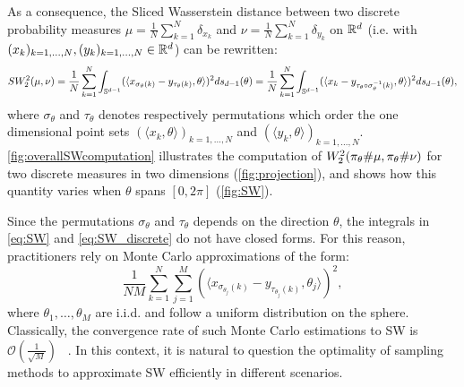 
As a consequence, the Sliced Wasserstein distance between two discrete
probability measures $\mu =
\frac{1}{N}\sum\limits_{k=1}^N \delta_{x_k}$ and  $\nu =
\frac{1}{N}\sum\limits_{k=1}^N \delta_{y_k}$ on $\mathbb{R}^{d}$ (i.e. with
$(x_k)_{k=1,\hdots,N},(y_k)_{k=1,\hdots,N} \in \mathbb{R}^{d}$) can be rewritten{:} 
\begin{equation} \label{eq:SW_discrete}
SW_2^2(\mu,\nu)= \frac{1}{N}\sum\limits_{k=1}^N\displaystyle\int_{\mathbb{S}^{d-1}}
(\langle x_{\sigma_{\theta}(k)} - y_{\tau_{\theta}(k)},\theta\rangle)^2
ds_{d-1}(\theta) = \frac{1}{N}\sum\limits_{k=1}^N\displaystyle\int_{\mathbb{S}^{d-1}}
(\langle x_{k} - y_{\tau_{\theta} \circ \sigma_{\theta}^{-1}(k)},\theta\rangle)^2
ds_{d-1}(\theta)  ,
\end{equation}
where
$\sigma_{\theta}$ and $\tau_{\theta}$ denotes respectively 
permutations which order the one dimensional  point sets $(\langle x_k,\theta\rangle)_{k=1,\hdots,N}$
and $(\langle y_k,\theta\rangle)_{k=1,\hdots,N}$. 
{\autoref{fig:overallSWcomputation}}
illustrates the
computation of $W_2^2(\pi_{\theta} \# \mu, \pi_{\theta} \# \nu)$ for two discrete measures in two dimensions 
{(\autoref{fig:projection})}, and 
{shows}
how this quantity varies when $\theta$ spans $[0,2\pi]$ 
{(\autoref{fig:SW})}.

\noindent Since the permutations $\sigma_{\theta}$ and $\tau_{\theta}$
depends on the direction $\theta$, 
the 
{integrals}
in \autoref{eq:SW} and \autoref{eq:SW_discrete}
do not have closed forms. For this reason, practitioners rely on Monte
Carlo approximations of the form{:}
\begin{equation}
  \label{eq:SW_MC}
 \frac{1}{NM}\sum\limits_{k=1}^N \sum\limits_{j=1}^M\displaystyle
(\langle x_{\sigma_{\theta_j}(k)} - y_{\tau_{\theta_j}(k)},\theta_j\rangle)^2,
\end{equation}
where $\theta_1,\dots,\theta_M$ are i.i.d. and follow a uniform
distribution on the sphere.
 Classically, the convergence rate of such Monte Carlo estimations to
 SW is  $\mathcal{O}(\frac 1 {\sqrt{M}})$ ~{\citep{hammersley1964monte}}.
 In this context, it is natural to question the optimality of sampling
 methods to approximate SW efficiently in different scenarios.

